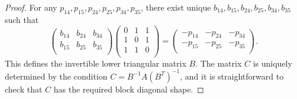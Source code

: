 \documentclass[10pt,a4paper]{amsart}
\begin{document}
\begin{proof}
For any $p_{14}, p_{15}, p_{24}, p_{25}, p_{34}, p_{35}$, there exist unique  $b_{14}, b_{15}, b_{24}, b_{25}, b_{34}, b_{35}$ such that
\[
\begin{pmatrix}
b_{14} & b_{24} & b_{34}\\
b_{15} & b_{25} & b_{35}\\
\end{pmatrix}
\begin{pmatrix}
0 & 1 & 1 \\
1 & 0 & 1 \\
1 & 1 & 0 \\
\end{pmatrix}
=\begin{pmatrix}
-p_{14} & -p_{24} & -p_{34} \\
-p_{15} & -p_{25} & -p_{35} \\
\end{pmatrix}.
\]
This defines the invertible lower triangular matrix $B$.
The matrix $C$ is uniquely determined by the condition $C=B^{-1}A(B^{T})^{-1}$, and it is straightforward to check that $C$ has the required block diagonal shape.

\end{proof}
\end{document}
